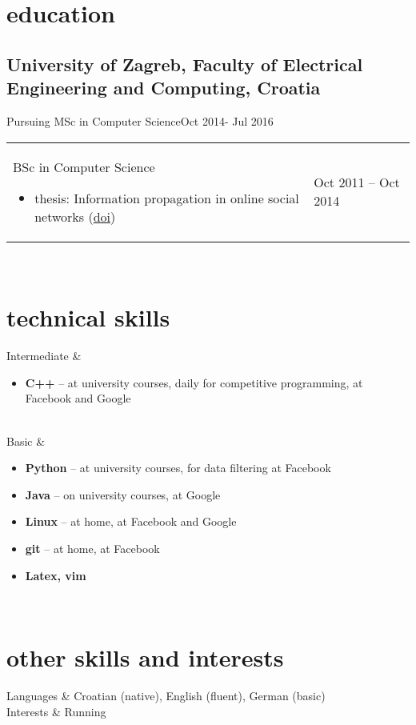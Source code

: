 \documentclass[a4paper]{article}
\makeatletter
\newlength{\tablewidth}
\newenvironment{period}[2]{%
\newcommand{\sarma}{#2}%
\setlength{\tablewidth}{\linewidth}
\addtolength{\tablewidth}{-2\tabcolsep}
\begin{tabular}{@{}p{0.75\tablewidth}>{\raggedleft\arraybackslash}p{0.25\tablewidth}@{}}%
#1 \newline
\begin{itemize}
}{%
\end{itemize} & \sarma \\%
\end{tabular}\\
}
\newenvironment{period_prazni}[1]{%
\newcommand{\sarma}{}%
\setlength{\tablewidth}{\linewidth}
\addtolength{\tablewidth}{-2\tabcolsep}
\begin{tabular}{@{}p{0.75\tablewidth}>{\raggedleft\arraybackslash}p{0.25\tablewidth}@{}}%
#1 \newline
& \sarma \\%
\end{tabular}\\
}
\newenvironment{skills}{%
\setlength{\tablewidth}{\linewidth}
\addtolength{\tablewidth}{-2\tabcolsep}
\begin{tabular}{@{}p{0.15\tablewidth}p{0.85\tablewidth}@{}}
}{%
\end{tabular}
}
\makeatother
\begin{document}
\section{education}
\subsection{University of Zagreb, Faculty of Electrical Engineering and Computing, Croatia}
\begin{period_prazni}{Pursuing MSc in Computer Science}{Oct 2014- Jul 2016}
\end{period_prazni}

\begin{period}{BSc in Computer Science}{Oct 2011 -- Oct 2014}
    \item thesis:
    \subitem
        Information propagation in online social networks (\href{https://zenodo.org/record/17918}{doi})
\end{period}

\section{technical skills}
\begin{skills}
    Intermediate &
    \begin{itemize}
        \item \textbf{C++} -- at university courses, daily for competitive programming, at Facebook and Google
    \end{itemize} \\
    Basic &
    \begin{itemize}
        \item \textbf{Python} -- at university courses, for data filtering at Facebook
             \item \textbf{Java} -- on university courses, at Google
      \item \textbf{Linux} -- at home, at Facebook and Google
        \item \textbf{git} -- at home, at Facebook
        \item \textbf {Latex, vim}
    \end{itemize} \\
\end{skills}

\section{other skills and interests}
\begin{skills}
    Languages & Croatian (native), English (fluent), German (basic) \\
    Interests & Running \\
\end{skills}
\end{document}
